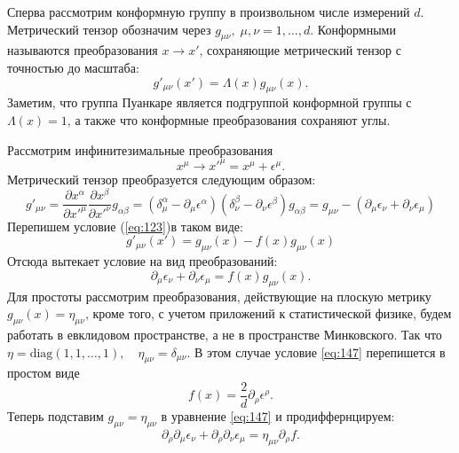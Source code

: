 \documentclass[a4paper,12pt]{article}
\theoremstyle{definition}
\theoremstyle{definition}
\theoremstyle{definition}
\begin{document}
Сперва рассмотрим конформную группу в произвольном числе измерений $d$. Метрический тензор обозначим через $g_{\mu\nu},\; \mu,\nu=1,\dots,d$. Конформными называются преобразования $x\to x'$, сохраняющие метрический тензор с точностью до масштаба:
\begin{equation}
  \label{eq:123}
  g'_{\mu\nu}(x')=\Lambda(x) g_{\mu\nu}(x).
\end{equation}
Заметим, что группа Пуанкаре является подгруппой конформной группы с $\Lambda(x)=1$, а также что конформные преобразования сохраняют углы. 

Рассмотрим инфинитезимальные преобразования
\begin{equation}
  \label{eq:144}
  x^{\mu}\to x'^{\mu}=x^{\mu}+\epsilon^{\mu}.
\end{equation}
Метрический тензор преобразуется следующим образом:
\begin{equation}
  \label{eq:145}
  g'_{\mu\nu}=\frac{\partial x^{\alpha}}{\partial x'^{\mu}}\frac{\partial x^{\beta}}{\partial x'^{\nu}} g_{\alpha\beta}=(\delta^{\alpha}_{\mu}-\partial_{\mu}\epsilon^{\alpha})(\delta^{\beta}_{\nu}-\partial_{\nu} \epsilon^{\beta})g_{\alpha\beta}=g_{\mu\nu}-(\partial_{\mu}\epsilon_{\nu}+\partial_{\nu}\epsilon_{\mu})
\end{equation}
Перепишем условие (\ref{eq:123})в таком виде:
\begin{equation}
  \label{eq:146}
  g'_{\mu\nu}(x')=g_{\mu\nu}(x)-f(x)g_{\mu\nu}(x)
\end{equation}
Отсюда вытекает условие на вид преобразований:
\begin{equation}
  \label{eq:147}
  \partial_{\mu}\epsilon_{\nu}+\partial_{\nu}\epsilon_{\mu}=f(x)g_{\mu\nu}(x).
\end{equation}
Для простоты рассмотрим преобразования, действующие на плоскую метрику $g_{\mu\nu}(x)=\eta_{\mu\nu}$, кроме того, с учетом приложений к статистической физике, будем работать в евклидовом пространстве, а не в пространстве Минковского. Так что $\eta=\mathrm{diag}(1,1,\dots,1),\quad \eta_{\mu\nu}=\delta_{\mu\nu}$. В этом случае условие \eqref{eq:147} перепишется в простом виде
\begin{equation}
  \label{eq:148}
  f(x)=\frac{2}{d}\partial_{\rho}\epsilon^{\rho}.
\end{equation}
Теперь подставим $g_{\mu\nu}=\eta_{\mu\nu}$ в уравнение \eqref{eq:147} и продиффернцируем:
\begin{equation}
  \label{eq:149}
  \partial_{\rho} \partial_{\mu}\epsilon_{\nu}+\partial_{\rho}\partial_{\nu}\epsilon_{\mu}=\eta_{\mu\nu}\partial_{\rho} f.
\end{equation}
\end{document}
